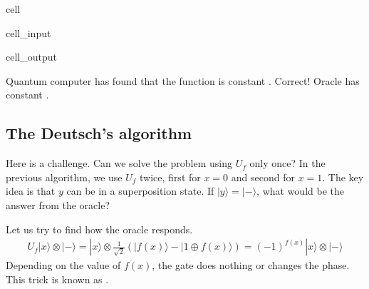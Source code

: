 \documentclass[letterpaper,10pt,english]{jupyterBook}
\begin{document}
\begin{sphinxuseclass}{cell}
\begin{sphinxVerbatimInput}
\begin{sphinxuseclass}{cell_input}
\begin{sphinxVerbatim}[commandchars=\\\{\}]

 
\end{sphinxVerbatim}

\end{sphinxuseclass}\end{sphinxVerbatimInput}
\begin{sphinxVerbatimOutput}

\begin{sphinxuseclass}{cell_output}
\begin{sphinxVerbatim}[commandchars=\\\{\}]
Quantum computer has found that the function is constant .
Correct! Oracle has constant .
\end{sphinxVerbatim}

\end{sphinxuseclass}\end{sphinxVerbatimOutput}

\end{sphinxuseclass}

\subsection{The Deutsch’s algorithm}
\label{\detokenize{algorithms/deutsch:the-deutsch-s-algorithm}}
\sphinxAtStartPar
Here is a challenge.  Can we solve the problem using \(U_f\) only once? In the previous algorithm, we use \(U_f\) twice, first for \(x=0\) and second for \(x=1\).  The key idea is that \(y\) can be in a superposition state.  If \(|y\rangle = |-\rangle\), what would be the answer from the oracle?

\sphinxAtStartPar
Let us try to find how the oracle responds.
\begin{equation*}
\begin{split}
U_f |x\rangle \otimes |-\rangle = |x \rangle \otimes \frac{1}{\sqrt{2}} \left( |f(x)\rangle - |1\oplus f(x)\rangle\right) = (-1)^{f(x)} |x\rangle \otimes |-\rangle
\end{split}
\end{equation*}
\sphinxAtStartPar
Depending on the value of \(f(x)\), the gate does nothing or changes the phase.  This trick is known as .
\end{document}
